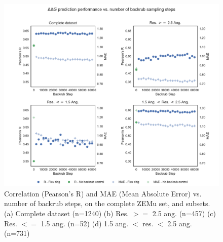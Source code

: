 \begin{figure}
  \includegraphics[width=\textwidth,keepaspectratio]{steps-v-corr_resolution.pdf}
  \caption[Flex ddG performance vs. number of backrub steps]{
    Correlation (Pearson's R) and MAE (Mean Absolute Error) vs. number of backrub steps, on the complete ZEMu set, and subsets.
    (a) Complete dataset (n=1240)
    (b) Res. $>=$ 2.5 ang. (n=457)
    (c) Res. $<=$ 1.5 ang. (n=52)
    (d) 1.5 ang. $<$ res. $<$ 2.5 ang. (n=731)
  } \label{fig:steps-v-corr_resolution}
\end{figure}
